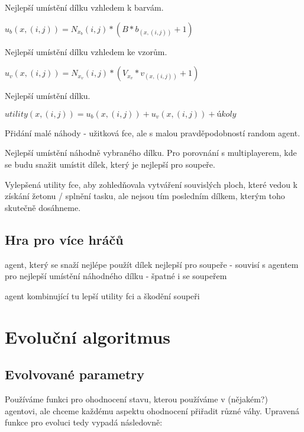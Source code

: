 Nejlepší umístění dílku vzhledem k barvám.

$u_b(x,(i,j)) = N_{x_b}(i,j)*(B*b_{(x,(i,j))} + 1)$

\vspace{10pt}

Nejlepší umístění dílku vzhledem ke vzorům.

$u_v(x,(i,j)) = N_{x_v}(i,j)*(V_{x_v}*v_{(x,(i,j))} + 1)$

\vspace{10pt}

Nejlepší umístění dílku.

$utility(x,(i,j)) = u_b(x,(i,j)) + u_v(x,(i,j)) + úkoly$

\vspace{10pt}

 Přidání malé náhody - užitková fce, ale s malou pravděpodobností random agent.

\vspace{10pt}

Nejlepší umístění náhodně vybraného dílku. Pro porovnání s multiplayerem, kde se budu snažit umístit dílek, který je nejlepší pro soupeře.

\vspace{10pt}

Vylepšená utility fce, aby zohledňovala vytváření souvislých ploch, které vedou k získání žetonu / splnění tasku, ale nejsou tím posledním dílkem, kterým toho skutečně dosáhneme.


\subsection{Hra pro více hráčů}

agent, který se snaží nejlépe použít dílek nejlepší pro soupeře - souvisí s agentem pro nejlepší umístění náhodného dílku - špatné i se soupeřem

agent kombinující tu lepší utility fci a škodění soupeři

\section{Evoluční algoritmus}
\subsection{Evolvované parametry}

Používáme funkci pro ohodnocení stavu, kterou používáme v (nějakém?) agentovi, ale chceme každému aspektu ohodnocení přiřadit různé váhy. Upravená funkce pro evoluci tedy vypadá následovně:

